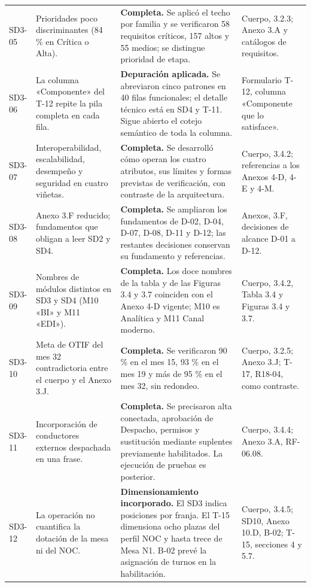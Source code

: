\begin{longtable}{@{}P{0.10\textwidth}P{0.27\textwidth}P{0.36\textwidth}P{\tabcolsep\relax}@{}}
SD3-05 & Prioridades poco discriminantes (84 \% en Crítica o Alta). & \textbf{Completa.} Se aplicó el techo por familia y se verificaron 58 requisitos críticos, 157 altos y 55 medios; se distingue prioridad de etapa. & Cuerpo, 3.2.3; Anexo 3.A y catálogos de requisitos. \\
SD3-06 & La columna «Componente» del T-12 repite la pila completa en cada fila. & \textbf{Depuración aplicada.} Se abreviaron cinco patrones en 40 filas funcionales; el detalle técnico está en SD4 y T-11. Sigue abierto el cotejo semántico de toda la columna. & Formulario T-12, columna «Componente que lo satisface». \\
SD3-07 & Interoperabilidad, escalabilidad, desempeño y seguridad en cuatro viñetas. & \textbf{Completa.} Se desarrolló cómo operan los cuatro atributos, sus límites y formas previstas de verificación, con contraste de la arquitectura. & Cuerpo, 3.4.2; referencias a los Anexos 4-D, 4-E y 4-M. \\
SD3-08 & Anexo 3.F reducido; fundamentos que obligan a leer SD2 y SD4. & \textbf{Completa.} Se ampliaron los fundamentos de D-02, D-04, D-07, D-08, D-11 y D-12; las restantes decisiones conservan su fundamento y referencias. & Anexos, 3.F, decisiones de alcance D-01 a D-12. \\
SD3-09 & Nombres de módulos distintos en SD3 y SD4 (M10 «BI» y M11 «EDI»). & \textbf{Completa.} Los doce nombres de la tabla y de las Figuras 3.4 y 3.7 coinciden con el Anexo 4-D vigente; M10 es Analítica y M11 Canal moderno. & Cuerpo, 3.4.2, Tabla 3.4 y Figuras 3.4 y 3.7. \\
SD3-10 & Meta de OTIF del mes 32 contradictoria entre el cuerpo y el Anexo 3.J. & \textbf{Completa.} Se verificaron 90 \% en el mes 15, 93 \% en el mes 19 y más de 95 \% en el mes 32, sin redondeo. & Cuerpo, 3.2.5; Anexo 3.J; T-17, R18-04, como contraste. \\
SD3-11 & Incorporación de conductores externos despachada en una frase. & \textbf{Completa.} Se precisaron alta conectada, aprobación de Despacho, permisos y sustitución mediante suplentes previamente habilitados. La ejecución de pruebas es posterior. & Cuerpo, 3.4.4; Anexo 3.A, RF-06.08. \\
SD3-12 & La operación no cuantifica la dotación de la mesa ni del NOC. & \textbf{Dimensionamiento incorporado.} El SD3 indica posiciones por franja. El T-15 dimensiona ocho plazas del perfil NOC y hasta trece de Mesa N1. B-02 prevé la asignación de turnos en la habilitación. & Cuerpo, 3.4.5; SD10, Anexo 10.D, B-02; T-15, secciones 4 y 5.7. \\

\end{longtable}
